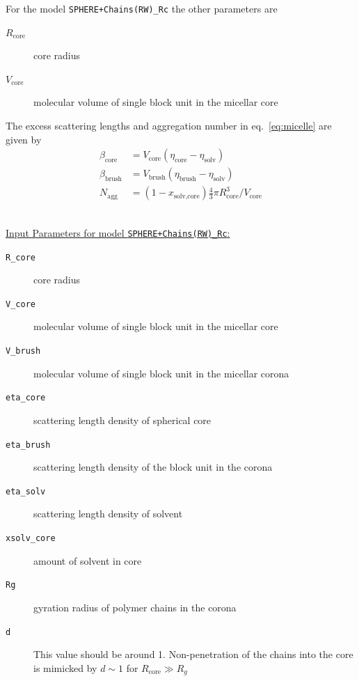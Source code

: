 \vspace{10mm}

\noindent
For the model \texttt{SPHERE+Chains(RW)\_Rc} the other parameters are
\begin{description}
\item[$R_\text{core}$] core radius
\item[$V_\text{core}$] molecular volume of single block unit in the micellar core
\end{description}
The excess scattering lengths and aggregation number in eq.\
\ref{eq:micelle} are given by
\begin{align}
\beta_\text{core}  &= V_\text{core}  (\eta_\text{core} -\eta_\text{solv}) \\
\beta_\text{brush} &= V_\text{brush} (\eta_\text{brush}-\eta_\text{solv}) \\
N_\text{agg} &= (1-x_\text{solv,core}) \frac{4}{3}\pi R_\text{core}^3  / V_\text{core}
\end{align}

\hspace{1pt}\\
\uline{Input Parameters for model \texttt{SPHERE+Chains(RW)\_Rc}:}
\begin{description}
\item[\texttt{R\_core}] core radius
\item[\texttt{V\_core}] molecular volume of single block unit in the micellar core
\item[\texttt{V\_brush}]  molecular volume of single block unit in the micellar corona
\item[\texttt{eta\_core}] scattering length density of spherical core
\item[\texttt{eta\_brush}] scattering length density of the block unit in the corona
\item[\texttt{eta\_solv}] scattering length density of solvent
\item[\texttt{xsolv\_core}] amount of solvent in core
\item[\texttt{Rg}] gyration radius of polymer chains in the corona
\item[\texttt{d}] This value should be around 1. Non-penetration of the chains
into the core is mimicked by $d\sim 1$ for $R_\text{core}\gg R_g$
\end{description}

\vspace{10mm}

